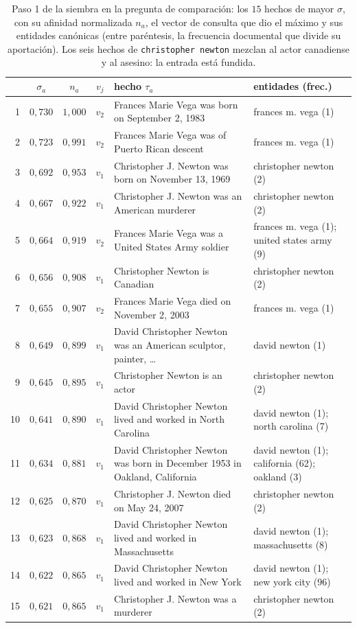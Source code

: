 \documentclass[11pt,a4paper]{article}
\begin{document}
\begin{table}[t]
\centering\scriptsize\setlength{\tabcolsep}{3pt}
\caption{Paso 1 de la siembra en la pregunta de comparación: los $15$
hechos de mayor $\sigma$, con su afinidad normalizada $n_a$, el vector
de consulta que dio el máximo y sus entidades canónicas (entre
paréntesis, la frecuencia documental que divide su aportación). Los seis
hechos de \texttt{christopher newton} mezclan al actor canadiense y al
asesino: la entrada está fundida.}
\label{tab:siembra-pasos}
\begin{tabular}{rcccp{}p{}}
\toprule
& $\sigma_a$ & $n_a$ & $v_j$ & hecho $\tau_a$ & entidades (frec.)\\
\midrule
1 & $0{,}730$ & $1{,}000$ & $v_2$ & Frances Marie Vega was born on September 2, 1983 & frances m. vega (1)\\
2 & $0{,}723$ & $0{,}991$ & $v_2$ & Frances Marie Vega was of Puerto Rican descent & frances m. vega (1)\\
3 & $0{,}692$ & $0{,}953$ & $v_1$ & Christopher J. Newton was born on November 13, 1969 & christopher newton (2)\\
4 & $0{,}667$ & $0{,}922$ & $v_1$ & Christopher J. Newton was an American murderer & christopher newton (2)\\
5 & $0{,}664$ & $0{,}919$ & $v_2$ & Frances Marie Vega was a United States Army soldier & frances m. vega (1); united states army (9)\\
6 & $0{,}656$ & $0{,}908$ & $v_1$ & Christopher Newton is Canadian & christopher newton (2)\\
7 & $0{,}655$ & $0{,}907$ & $v_2$ & Frances Marie Vega died on November 2, 2003 & frances m. vega (1)\\
8 & $0{,}649$ & $0{,}899$ & $v_1$ & David Christopher Newton was an American sculptor, painter, \dots & david newton (1)\\
9 & $0{,}645$ & $0{,}895$ & $v_1$ & Christopher Newton is an actor & christopher newton (2)\\
10 & $0{,}641$ & $0{,}890$ & $v_1$ & David Christopher Newton lived and worked in North Carolina & david newton (1); north carolina (7)\\
11 & $0{,}634$ & $0{,}881$ & $v_1$ & David Christopher Newton was born in December 1953 in Oakland, California & david newton (1); california (62); oakland (3)\\
12 & $0{,}625$ & $0{,}870$ & $v_1$ & Christopher J. Newton died on May 24, 2007 & christopher newton (2)\\
13 & $0{,}623$ & $0{,}868$ & $v_1$ & David Christopher Newton lived and worked in Massachusetts & david newton (1); massachusetts (8)\\
14 & $0{,}622$ & $0{,}865$ & $v_1$ & David Christopher Newton lived and worked in New York & david newton (1); new york city (96)\\
15 & $0{,}621$ & $0{,}865$ & $v_1$ & Christopher J. Newton was a murderer & christopher newton (2)\\
\bottomrule
\end{tabular}
\end{table}
\end{document}
